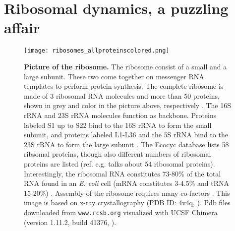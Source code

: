 



\chapter{Ribosomal dynamics, a puzzling affair}
\label{chapter:ribosomes}



\begin{figure}
    \centering    
    \texttt{[image: ribosomes\_allproteinscolored.png]}
    \caption{ 
        \textbf{Picture of the ribosome.}
        The ribosome consist of a small and a large subunit. These two come together on messenger RNA templates to perform protein synthesis.
        The complete ribosome is made of 3 ribosomal RNA molecules and more than 50 proteins, shown in grey and color in the picture above, respectively \cite{Chen2013}.
        The 16S rRNA and 23S rRNA molecules function as backbone. %
        Proteins labeled S1 up to S22 
        bind to the 16S rRNA to form the small subunit, and proteins labeled L1-L36 and the 5S rRNA bind to the 23S rRNA to form the large subunit \cite{Keseler2017}.
        The Ecocyc database lists 58 ribsomal proteins, though also different numbers of ribosomal proteins are listed (ref. \cite{Chen2013} e.g. talks about 54 ribosomal proteins).
        Interestingly, the ribosomal RNA constitutes 73-80\% of the total RNA found in an \textit{E. coli} cell (mRNA constitutes 3-4.5\% and tRNA 15-20\%) \cite{Norris1972}.
        Assembly of the ribosome requires many co-factors \cite{Chen2013}. %
        This image is based on x-ray crystallography (PDB ID: 4v4q, \cite{Schuwirth2005}). Pdb files downloaded from \texttt{www.rcsb.org} \cite{Berman2000} 
        visualized with UCSF Chimera (version 1.11.2, build 41376, \cite{pettersen2004}).
    }
    \label{fig:ribo:pictureofribo}
\end{figure}


